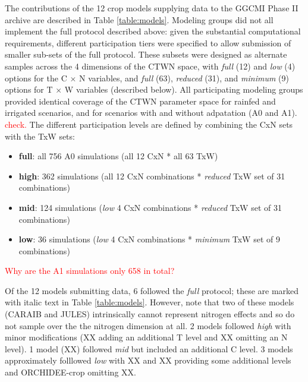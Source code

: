 \documentclass[gmd, manuscript]{copernicus} %
\begin{document}
The contributions of the 12 crop models supplying data to the GGCMI Phase II archive are described in Table \ref{table:models}. 
Modeling groups did not all implement the full protocol described above:
given the substantial computational requirements, 
different participation tiers were specified to allow submission of smaller sub-sets of the full protocol. 
These subsets were designed as alternate samples across the 4 dimensions of the CTWN space,  %
with \textit{full} (12) and \textit{low} (4) options for the C $\times$ N variables, and \textit{full} (63), \textit{reduced} (31), and \textit{minimum} (9) options for T $\times$ W variables (described below). All participating modeling groups provided identical coverage of the CTWN parameter space for rainfed and irrigated scenarios, and for scenarios with and without adpatation (A0 and A1). \textcolor{red}{check.} 
The different participation levels are defined by combining the CxN sets with the TxW sets:
\begin{itemize}
\item{\textbf{full}: all 756 A0 simulations (all 12 CxN * all 63 TxW)}
\item{\textbf{high}: 362 simulations (all 12 CxN combinations * \textit{reduced} TxW set of 31 combinations)}
\item{\textbf{mid}: 124 simulations (\textit{low} 4 CxN combinations * \textit{reduced} TxW set of 31 combinations)}
\item{\textbf{low}: 36 simulations (\textit{low} 4 CxN combinations * \textit{minimum} TxW set of 9 combinations)}
\end{itemize}
\textcolor{red}{Why are the A1 simulations only 658 in total?}

Of the 12 models submitting data, 6 followed the \textit{full} protocol; these are marked with italic text in Table \ref{table:models}. However, note that two of these models (CARAIB and JULES) intrinsically cannot represent nitrogen effects and so do not sample over the the nitrogen dimension at all. 2 models followed \textit{high} with minor modifications (XX adding an additional T level and XX  omitting an N level). 1 model (XX) followed \textit{mid} but included an additional C level. 3 models approximately folllowed \textit{low} with XX and XX providing some additional levels and ORCHIDEE-crop omitting XX.  
\end{document}
